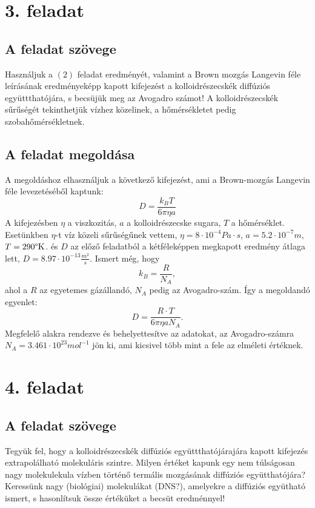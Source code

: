 \documentclass[12pt]{article}
\begin{document}
\section*{3. feladat} 
\subsection*{ A feladat szövege}
Használjuk a $(2)$ feladat eredményét, valamint a Brown mozgás Langevin féle leírásának eredményeképp
kapott kifejezést a kolloidrészecskék diffúziós együttthatójára, s becsüjük meg az Avogadro számot! A kolloidrészecskék sűrűségét tekinthetjük vízhez közelinek, a hőmérsékletet pedig szobahőmérsékletnek.

 
 \subsection*{A feladat megoldása}
 A megoldáshoz elhasználjuk a következő kifejezést, ami a Brown-mozgás Langevin féle levezetéséből kaptunk:
$$D = \frac{k_B T}{6\pi\eta a}$$
A kifejezésben $\eta$ a viszkozitás, $a$ a kolloidrészecske sugara, $T$ a hőmérséklet. Esetünkben $\eta$-t víz közeli sűrűségűnek vettem, $\eta = 8\cdot 10^{-4} Pa\cdot s$, $a = 5.2\cdot 10^{-7} m$, $T = 290 \text{\textdegree{K}}$. és $D$ az előző feladatból a kétféleképpen megkapott eredmény átlaga lett, $D = 8.97\cdot 10^{-13}\frac{m^2}{s}$. Ismert még, hogy $$k_B= \frac{R}{N_A},$$ ahol a $R$ az egyetemes gázállandó, $N_A$ pedig az Avogadro-szám. Így a megoldandó egyenlet:
$$ D = \frac{R\cdot T}{6\pi \eta a N_A} .$$
Megfelelő alakra rendezve és behelyettesítve az adatokat\cite{wik}, az Avogadro-számra $N_A = 3.461\cdot 10^{23} mol^{-1}$ jön ki, ami kicsivel több mint a fele az elméleti értéknek. 



\newpage
\section*{4. feladat}
\subsection*{ A feladat szövege}
Tegyük fel, hogy a kolloidrészecskék diffúziós együttthatójárajára kapott kifejezés extrapolálható molekuláris
szintre. Milyen értéket kapunk egy nem túlságosan nagy molekulekula vízben történő termális mozgásának diffúziós együtthatójára? Keressünk nagy (biológiai) molekulákat (DNS?), amelyekre a diffúziós együtható ismert, s hasonlítsuk össze értéküket a becsüt eredménnyel!
\end{document}
